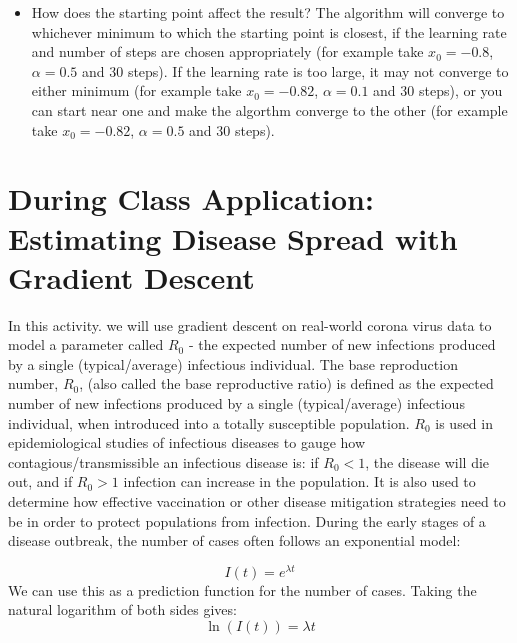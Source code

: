 \documentclass[11pt]{article}
\begin{document}
\begin{enumerate}
\begin{itemize}
        \item How does the starting point affect the result?
        {\color{blue}
         The algorithm will converge to whichever minimum to which the starting point is closest, if the learning rate and number of steps are chosen appropriately (for example take $x_0 = -0.8$, $\alpha = 0.5$ and 30 steps). If the learning rate is too large, it may not converge to either minimum (for example take $x_0 = -0.82$, $\alpha = 0.1$ and 30 steps), or you can start near one and make the algorthm converge to the other (for example take $x_0 = -0.82$, $\alpha = 0.5$ and 30 steps). }
    \end{itemize}

\end{enumerate}









\section*{During Class Application: Estimating Disease Spread with Gradient Descent}
In this activity. we will use gradient descent on real-world corona virus data to model a parameter called $R_0$ - the expected number of new infections produced by a single (typical/average) infectious individual.
The base reproduction number, $R_0$, (also called the base reproductive ratio) is defined as the expected number of new infections produced by a single (typical/average) infectious individual, when introduced into a totally susceptible population. $R_0$ is used in epidemiological studies of infectious diseases to gauge how contagious/transmissible an infectious disease is: if $R_0 < 1$, the disease will die out, and if $R_0 > 1$ infection can increase in the population. It is also used to determine how effective vaccination or other disease mitigation strategies need to be in order to protect populations from infection.
During the early stages of a disease outbreak, the number of cases often follows an exponential model:



\[
I(t) = e^{\lambda t}
\]
We can use this as a prediction function for the number of cases.
Taking the natural logarithm of both sides gives:
\[
\ln (I(t)) = \lambda t
\]
\end{document}
